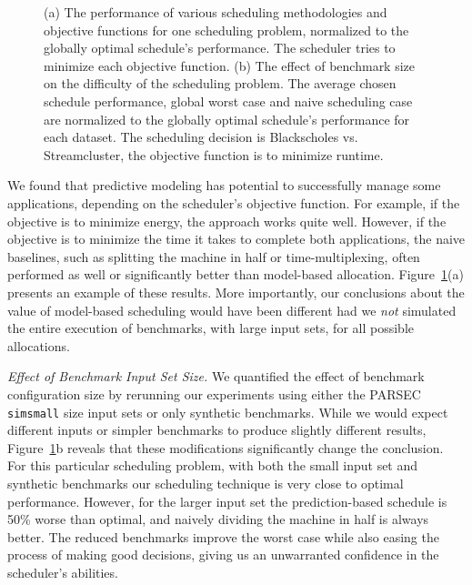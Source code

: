 \begin{figure}[htb]
	\noindent{}
        \caption{\label{fig:case_study_outcome}  (a) The performance
          of various scheduling methodologies and objective functions
          for one scheduling problem, normalized to the globally
          optimal schedule's performance.  The scheduler tries to
          minimize each objective function.  (b) The effect of
          benchmark size on the difficulty of the scheduling problem.
          The average chosen schedule performance, global worst case
          and naive scheduling case are normalized to the globally
          optimal schedule's performance for each dataset. The
          scheduling decision is Blackscholes vs. Streamcluster, the
          objective function is to minimize runtime.
 }
\end{figure}

We found that predictive modeling has potential to successfully manage
some applications, depending on the scheduler's objective function.
For example, if the objective is to minimize energy, the approach
works quite well.  However, if the objective is to minimize the time
it takes to complete both applications, the naive baselines, such as
splitting the machine in half or time-multiplexing, often performed as
well or significantly better than model-based
allocation. Figure~\ref{fig:case_study_outcome}(a) presents an example
of these results. More importantly, our conclusions about the value of
model-based scheduling would have been different had we \emph{not}
simulated the entire execution of benchmarks, with large input sets,
for all possible allocations.

\emph{Effect of Benchmark Input Set Size.}
We quantified the effect of benchmark configuration size by rerunning
our experiments using either the PARSEC \texttt{ simsmall} size input sets
or only synthetic benchmarks. While we would expect different inputs
or simpler benchmarks to produce slightly different results,
Figure~\ref{fig:case_study_outcome}b reveals that these modifications
significantly change the conclusion.  For this particular scheduling
problem, with both the small input set and synthetic benchmarks our
scheduling technique is very close to optimal performance.  However,
for the larger input set the prediction-based schedule is 50\% worse
than optimal, and naively dividing the machine in half is always
better. The reduced benchmarks improve the worst case while also
easing the process of making good decisions, giving us an unwarranted
confidence in the scheduler's abilities.

